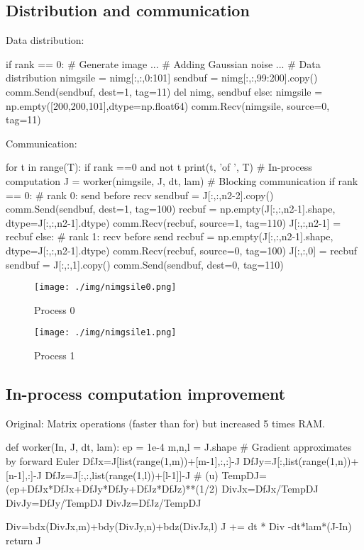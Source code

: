 \documentclass{article}
\begin{document}
\subsection{Distribution and communication}
Data distribution:
\begin{python}
  if rank == 0:
    # Generate image
    ...
    # Adding Gaussian noise
    ...
    # Data distribution
    nimgsile = nimg[:,:,0:101]
    sendbuf = nimg[:,:,99:200].copy()
    comm.Send(sendbuf, dest=1, tag=11)
    del nimg, sendbuf
  else:
    nimgsile = np.empty([200,200,101],dtype=np.float64)
    comm.Recv(nimgsile, source=0, tag=11)
\end{python}

Communication:
\begin{python}
  for t in range(T):
    if rank ==0 and not t%
      print(t, 'of ', T)
    # In-process computation
    J = worker(nimgsile, J, dt, lam)
    # Blocking communication
    if rank == 0:
      # rank 0: send before recv
      sendbuf = J[:,:,n2-2].copy()
      comm.Send(sendbuf, dest=1, tag=100)
      recbuf = np.empty(J[:,:,n2-1].shape, dtype=J[:,:,n2-1].dtype)	
      comm.Recv(recbuf, source=1, tag=110)	
      J[:,:,n2-1] = recbuf
    else:
      # rank 1: recv before send
      recbuf = np.empty(J[:,:,n2-1].shape, dtype=J[:,:,n2-1].dtype)	
      comm.Recv(recbuf, source=0, tag=100)
      J[:,:,0] = recbuf	
      sendbuf = J[:,:,1].copy()	
      comm.Send(sendbuf, dest=0, tag=110)
\end{python}
\begin{figure}[htp]
\begin{minipage}{0.5\linewidth}
\centering
\texttt{[image: ./img/nimgsile0.png]}
\caption{Process 0}
\label{fig:1a}
\end{minipage}%
\begin{minipage}{0.5\linewidth}
\centering
\texttt{[image: ./img/nimgsile1.png]}
\caption{Process 1}
\label{fig:1b}
\end{minipage}
\end{figure}

\subsection{In-process computation improvement}
Original: Matrix operations (faster than for) but increased 5 times RAM.
\begin{python}
def worker(In, J, dt, lam):
  ep = 1e-4
  m,n,l = J.shape
  # Gradient approximates by forward Euler
  DfJx=J[list(range(1,m))+[m-1],:,:]-J
  DfJy=J[:,list(range(1,n))+[n-1],:]-J
  DfJz=J[:,:,list(range(1,l))+[l-1]]-J
  # \varphi(\nabla u)
  TempDJ=(ep+DfJx*DfJx+DfJy*DfJy+DfJz*DfJz)**(1/2)
  DivJx=DfJx/TempDJ
  DivJy=DfJy/TempDJ
  DivJz=DfJz/TempDJ

  Div=bdx(DivJx,m)+bdy(DivJy,n)+bdz(DivJz,l)
  J += dt * Div -dt*lam*(J-In)
  return J
\end{python}
\end{document}
